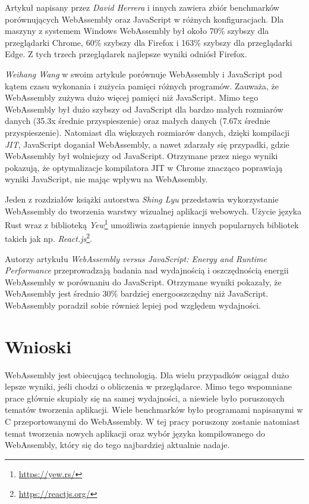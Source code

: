 \documentclass[language=polish,type=master]{aghmodern}
\begin{document}
Artykuł \cite{wasm_js_bench} napisany przez \emph{David Herrera} i innych zawiera zbiór benchmarków porównujących WebAssembly oraz JavaScript w różnych konfiguracjach.
Dla maszyny z systemem Windows WebAssembly był około 70\% szybszy dla przeglądarki Chrome, 60\% szybszy dla Firefox i 163\% szybszy dla przeglądarki Edge.
Z tych trzech przeglądarek najlepsze wyniki odniósł Firefox.

\emph{Weihang Wang} w swoim artykule \cite{wasm_js_bench2} porównuje WebAssembly i JavaScript pod kątem czasu wykonania i zużycia pamięci różnych programów.
Zauważa, że WebAssembly zużywa dużo więcej pamięci niż JavaScript.
Mimo tego WebAssembly był dużo szybszy od JavaScript dla bardzo małych rozmiarów danych (35.3x średnie przyspieszenie) oraz małych danych (7.67x średnie przyspieszenie).
Natomiast dla większych rozmiarów danych, dzięki kompilacji \emph{JIT}\footnotemark{}, JavaScript doganiał WebAssembly, a nawet zdarzały się przypadki, gdzie WebAssembly był wolniejszy od JavaScript.
Otrzymane przez niego wyniki pokazują, że optymalizacje kompilatora JIT w Chrome znacząco poprawiają wyniki JavaScript, nie mając wpływu na WebAssembly.

Jeden z rozdziałów książki \cite{wasm_yew} autorstwa \emph{Shing Lyu} przedstawia wykorzystanie WebAssembly do tworzenia warstwy wizualnej aplikacji webowych.
Użycie języka Rust wraz z biblioteką \emph{Yew}\footnote{\url{https://yew.rs/}} umożliwia zastąpienie innych popularnych bibliotek takich jak np. \emph{React.js}\footnote{\url{https://reactjs.org/}}.

Autorzy artykułu \cite{wasm_energy} \emph{WebAssembly versus JavaScript: Energy and Runtime Performance} przeprowadzają badania nad wydajnością i oszczędnością energii WebAssembly w porównaniu do JavaScript.
Otrzymane wyniki pokazały, że WebAssembly jest średnio 30\% bardziej energooszczędny niż JavaScript.
WebAssembly poradził sobie również lepiej pod względem wydajności.

\section{Wnioski}
WebAssembly jest obiecującą technologią.
Dla wielu przypadków osiągał dużo lepsze wyniki, jeśli chodzi o obliczenia w przeglądarce.
Mimo tego wspomniane prace głównie skupiały się na samej wydajności, a niewiele było poruszonych tematów tworzenia aplikacji.
Wiele benchmarków było programami napisanymi w C przeportowanymi\footnotemark{} do WebAssembly.
W tej pracy poruszony zostanie natomiast temat tworzenia nowych aplikacji oraz wybór języka kompilowanego do WebAssembly, który się do tego najbardziej aktualnie nadaje.
\end{document}
